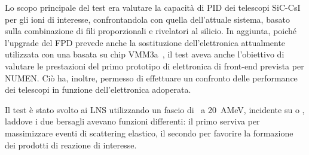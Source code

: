 Lo scopo principale del test era valutare la capacità di PID dei telescopi SiC-CsI per gli ioni di interesse, confrontandola con quella dell'attuale sistema, basato sulla combinazione di fili proporzionali e rivelatori al silicio.
In aggiunta, poiché l'upgrade del FPD prevede anche la sostituzione dell'elettronica attualmente utilizzata con una basata su chip VMM3a~\cite{degeronimo:ieee13}, il test aveva anche l'obiettivo di valutare le prestazioni del primo prototipo di elettronica di front-end prevista per NUMEN.
Ciò ha, inoltre, permesso di effettuare un confronto delle performance dei telescopi in funzione dell'elettronica adoperata.

Il test è stato svolto ai LNS utilizzando un fascio di~ a 20~AMeV, incidente su  o , laddove i due bersagli avevano funzioni differenti: il primo serviva per massimizzare eventi di scattering elastico, il secondo per favorire la formazione dei prodotti di reazione di interesse.






\subsection{} \label{par:telescopi}

